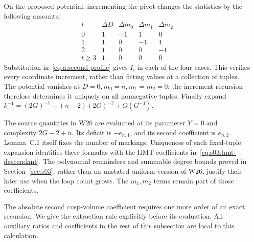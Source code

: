\begin{prf}
On the proposed potential, incrementing the pivot changes the statistics
by the following amounts:
\[
\begin{array}{c|rrrr}
 t&\Delta D&\Delta m_0&\Delta m_1&\Delta m_2\\\hline
 0&1&-1&1&0\\
 1&1&0&-1&1\\
 2&1&0&0&-1\\
 t\geq3&1&0&0&0
\end{array}
\]
Substitution in~\eqref{eq:a:second-profile} gives $I_i$ in each of
the four cases. This verifies every coordinate increment, rather
than fitting values at a collection of tuples. The potential vanishes
at $D=0,m_0=n,m_1=m_2=0$; the increment recursion therefore determines
it uniquely on all nonnegative tuples. Finally expand
$k^{-1}=(2G)^{-1}-(n-2)(2G)^{-2}+O(G^{-3})$.
\end{prf}

\begin{rmk}[Identification]
The source quantities in W26 are evaluated at its parameter $Y=0$ and
complexity $2G-2+n$. Its deficit is $-e_{n,1}$, and its second coefficient
is $e_{n,2}$. Lemma~C.1 itself fixes the number of markings. Uniqueness
of each fixed-tuple expansion identifies these formulas with the HMT
coefficients in~\eqref{eq:s03:hmt-descendant}. The polynomial remainders
and summable degree bounds proved in Section~\ref{sec:s03}, rather than
an unstated uniform version of W26, justify their later use when the
loop count grows. The $m_1,m_2$ terms remain part of those coefficients.
\end{rmk}

The absolute second cusp-volume coefficient requires one more order of
an exact recursion. We give the extraction rule explicitly before its
evaluation. All auxiliary ratios and coefficients in the rest of this
subsection are local to this calculation.

